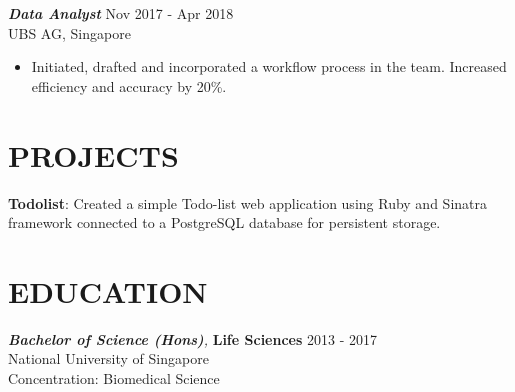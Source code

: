 \documentclass[margin, 11pt]{res} %
\begin{document}
\begin{resume}
{\sl \textbf{Data Analyst}} \hfill Nov 2017 - Apr 2018 \\
UBS AG, Singapore
\begin{itemize}
\item Initiated, drafted and incorporated a workflow process in the team. Increased efficiency and accuracy by 20\%.
\end{itemize} 


\section{PROJECTS}
\textbf{Todolist}: Created a simple Todo-list web application using Ruby and Sinatra framework connected to a PostgreSQL database for persistent storage.\\
\texttt{}



\section{EDUCATION}

{\sl \textbf{Bachelor of Science (Hons)},} \textbf{Life Sciences} \hfill 2013 - 2017 \\
National University of Singapore \\
Concentration: Biomedical Science \\




\end{resume}
\end{document}
